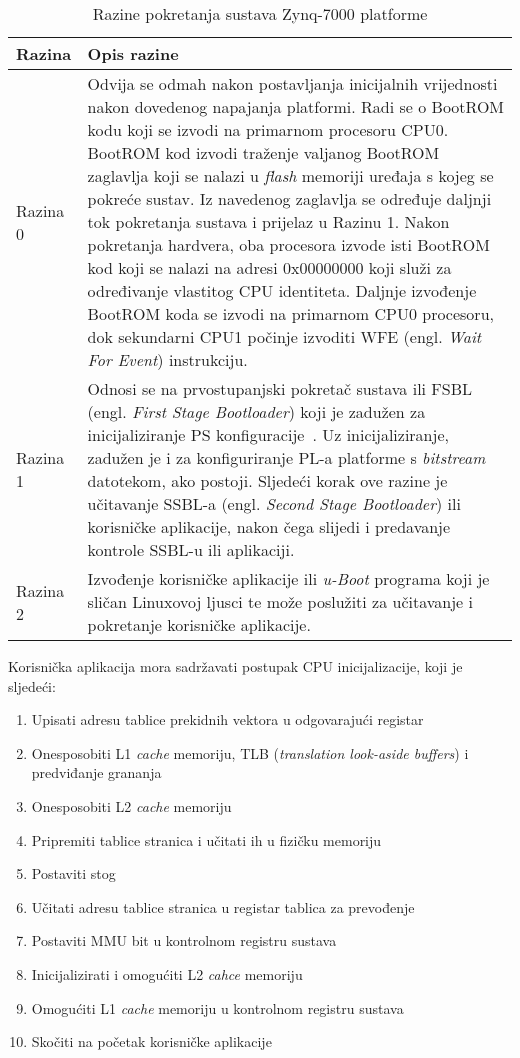 \documentclass[times, utf8, diplomski, numeric]{fer}
\begin{document}
\begin{table}[H]
  \centering
  \caption{Razine pokretanja sustava Zynq-7000 platforme}
  \label{boot_stages}
  \begin{tabular}{|| p{2cm} | p{12cm} ||}
    \hline
    \textbf{Razina} & \textbf{Opis razine} \\
    \hline\hline
    Razina 0 & Odvija se odmah nakon postavljanja inicijalnih vrijednosti nakon dovedenog napajanja platformi.
    Radi se o BootROM kodu koji se izvodi na primarnom procesoru CPU0. BootROM kod izvodi traženje valjanog
    BootROM zaglavlja koji se nalazi u \textit{flash} memoriji uređaja s kojeg se pokreće sustav. Iz navedenog
    zaglavlja se određuje daljnji tok pokretanja sustava i prijelaz u Razinu 1. Nakon pokretanja hardvera, oba
    procesora izvode isti BootROM kod koji se nalazi na adresi 0x00000000 koji služi za određivanje vlastitog
    CPU identiteta. Daljnje izvođenje BootROM koda se izvodi na primarnom CPU0 procesoru, dok sekundarni CPU1
    počinje izvoditi WFE (engl. \textit{Wait For Event}) instrukciju.\\
    \hline
    Razina 1 & Odnosi se na prvostupanjski pokretač sustava ili FSBL (engl. \textit{First Stage Bootloader}) koji
    je zadužen za inicijaliziranje PS konfiguracije~\cite{zynq_swdg}. Uz inicijaliziranje, zadužen je i za konfiguriranje PL-a
    platforme s \textit{bitstream} datotekom, ako postoji. Sljedeći korak ove razine je učitavanje SSBL-a (engl.
    \textit{Second Stage Bootloader}) ili korisničke aplikacije, nakon čega slijedi i predavanje kontrole SSBL-u
    ili aplikaciji.\\
    \hline
    Razina 2 & Izvođenje korisničke aplikacije ili \textit{u-Boot} programa koji je sličan Linuxovoj ljusci te može
    poslužiti za učitavanje i pokretanje korisničke aplikacije.\\
    \hline
  \end{tabular}
\end{table}
Korisnička aplikacija mora sadržavati postupak CPU inicijalizacije, koji je sljedeći:
\begin{enumerate}
  \item{Upisati adresu tablice prekidnih vektora u odgovarajući registar}
  \item{Onesposobiti L1 \textit{cache} memoriju, TLB (\textit{translation look-aside buffers}) i predviđanje grananja}
  \item{Onesposobiti L2 \textit{cache} memoriju}
  \item{Pripremiti tablice stranica i učitati ih u fizičku memoriju}
  \item{Postaviti stog}
  \item{Učitati adresu tablice stranica u registar tablica za prevođenje}
  \item{Postaviti MMU bit u kontrolnom registru sustava}
  \item{Inicijalizirati i omogućiti L2 \textit{cahce} memoriju}
  \item{Omogućiti L1 \textit{cache} memoriju u kontrolnom registru sustava}
  \item{Skočiti na početak korisničke aplikacije}
\end{enumerate}
\end{document}
